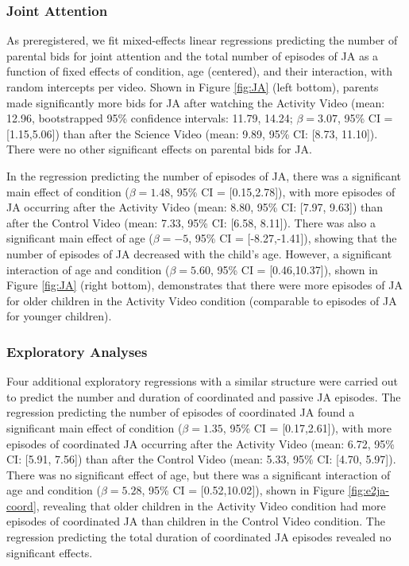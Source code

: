 \documentclass[man,floatsintext]{apa6}
\begin{document}
\hypertarget{joint-attention-1}{%
\subsubsection{Joint Attention}\label{joint-attention-1}}

As preregistered, we fit mixed-effects linear regressions predicting the number of parental bids for joint attention and the total number of episodes of JA as a function of fixed effects of condition, age (centered), and their interaction, with random intercepts per video.
Shown in Figure \ref{fig:JA} (left bottom), parents made significantly more bids for JA after watching the Activity Video (mean: 12.96, bootstrapped 95\% confidence intervals: 11.79, 14.24; \(\beta=3.07\), 95\% CI = {[}1.15,5.06{]}) than after the Science Video (mean: 9.89, 95\% CI: {[}8.73, 11.10{]}).
There were no other significant effects on parental bids for JA.

In the regression predicting the number of episodes of JA, there was a significant main effect of condition (\(\beta=1.48\), 95\% CI = {[}0.15,2.78{]}), with more episodes of JA occurring after the Activity Video (mean: 8.80, 95\% CI: {[}7.97, 9.63{]}) than after the Control Video (mean: 7.33, 95\% CI: {[}6.58, 8.11{]}).
There was also a significant main effect of age (\(\beta=-5\), 95\% CI = {[}-8.27,-1.41{]}), showing that the number of episodes of JA decreased with the child's age.
However, a significant interaction of age and condition (\(\beta=5.60\), 95\% CI = {[}0.46,10.37{]}), shown in Figure \ref{fig:JA} (right bottom), demonstrates that there were more episodes of JA for older children in the Activity Video condition (comparable to episodes of JA for younger children).

\hypertarget{exploratory-analyses-1}{%
\subsubsection{Exploratory Analyses}\label{exploratory-analyses-1}}

Four additional exploratory regressions with a similar structure were carried out to predict the number and duration of coordinated and passive JA episodes.
The regression predicting the number of episodes of coordinated JA found a significant main effect of condition (\(\beta=1.35\), 95\% CI = {[}0.17,2.61{]}), with more episodes of coordinated JA occurring after the Activity Video (mean: 6.72, 95\% CI: {[}5.91, 7.56{]}) than after the Control Video (mean: 5.33, 95\% CI: {[}4.70, 5.97{]}).
There was no significant effect of age, but there was a significant interaction of age and condition (\(\beta=5.28\), 95\% CI = {[}0.52,10.02{]}), shown in Figure \ref{fig:e2ja-coord}, revealing that older children in the Activity Video condition had more episodes of coordinated JA than children in the Control Video condition.
The regression predicting the total duration of coordinated JA episodes revealed no significant effects.
\end{document}
